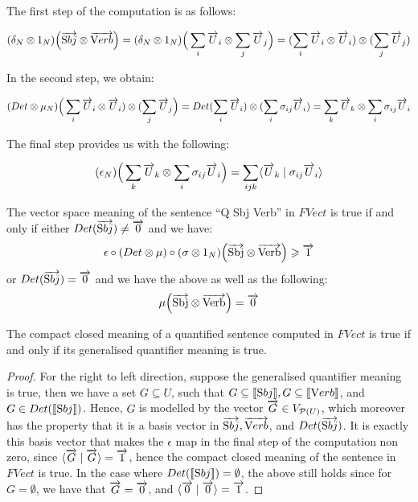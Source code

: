 The first step of the computation  is as follows:


\begin{align*}
(\delta_N \otimes 1_{N})\Big(\overrightarrow{\text Sbj} \otimes \overrightarrow{\text Verb}\Big) =   (\delta_N \otimes 1_{N})\Big(\sum_i \overrightarrow{U}_i  \otimes \sum_j \overrightarrow{U}_j \Big ) = (\sum_i \overrightarrow{U}_i \otimes \overrightarrow{U}_i) \otimes (\sum_j \overrightarrow{U}_j)
\end{align*}

\noindent
In the second step, we obtain:

\begin{align*}
(Det \otimes  \mu_N)\Big(\sum_i \overrightarrow{U}_i \otimes \overrightarrow{U}_i) \otimes (\sum_j \overrightarrow{U}_j\Big) =  Det(\sum_i \overrightarrow{U}_i) \otimes  (\sum_i \sigma_{ij} \overrightarrow{U}_i)   = \sum_k \overrightarrow{U}_k \otimes \sum_i \sigma_{ij} \overrightarrow{U}_i
\end{align*}

\noindent
The final step  provides us with the following:

\begin{align*}
(\epsilon_{N})  \Big(\sum_k \overrightarrow{U}_k \otimes \sum_i \sigma_{ij} \overrightarrow{U}_i  \Big) =  \sum_{ijk}  \langle  \overrightarrow{U}_k   \mid  \sigma_{ij} \overrightarrow{U}_i \rangle  
\end{align*}

\begin{definition}
\label{deftrue}
The vector space meaning of the sentence ``Q Sbj Verb'' in $FVect$  is true if and only if either $Det(\overrightarrow{\text Sbj}) \neq \overrightarrow{0}$ and we have: 
\[
\epsilon \circ (Det \otimes \mu) \circ (\sigma \otimes 1_N) \Big(\overrightarrow{\text{Sbj}} \otimes \overrightarrow{\text{Verb}} \Big) \geqslant \overrightarrow{1} 
\] 
or  $Det(\overrightarrow{\text Sbj}) = \overrightarrow{0}$ and we have the above as well as the following:
\[
\mu \Big(\overrightarrow{\text{Sbj}} \otimes \overrightarrow{\text{Verb}} \Big) = \overrightarrow{0}\]
\end{definition}

\begin{proposition}
The  compact closed meaning of a quantified sentence computed in $FVect$  is true if and only if  its generalised quantifier meaning is true.
\end{proposition}

\begin{proof}
For the right to left direction, suppose the generalised quantifier meaning is true, then we have a set $G \subseteq U$, such that  $G\subseteq[\![ \text Sbj ]\!], G \subseteq [\![ \text Verb ]\!]$, and $G \in Det ([\![ \text Sbj ]\!])$. Hence, $G$ is modelled by the vector $\overrightarrow{G} \in V_{{\cal P}(U)}$, which moreover has the property that it is a basis vector in $\overrightarrow{\text Sbj},  \overrightarrow{\text Verb}$, and $Det(\overrightarrow{\text Sbj})$. It is exactly this basis vector that makes the $\epsilon$ map in the final step of the computation non zero, since  $\langle \overrightarrow{G} \mid \overrightarrow{G}\rangle = \overrightarrow{1}$, hence the compact closed meaning of the sentence in $FVect$ is  true. In the case where $Det([\![ \text Sbj ]\!]) = \emptyset$, the above still holds since for $G = \emptyset$, we have that $\overrightarrow{G} = \overrightarrow{0}$, and $\langle \overrightarrow{0} \mid \overrightarrow{0} \rangle = \overrightarrow{1}$. 
\end{proof}

